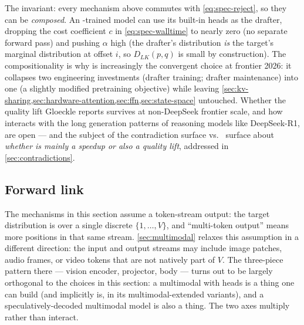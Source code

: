 The  invariant: every mechanism above commutes with
\cref{eq:spec-reject}, so they can be \emph{composed}. An -trained
model can use its built-in heads as the drafter, dropping the cost
coefficient $c$ in \cref{eq:spec-walltime} to nearly zero (no separate
forward pass) and pushing $\alpha$ high (the drafter's distribution
\emph{is} the target's marginal distribution at offset $i$, so
$D_{LK}(p, q)$ is small by construction). The compositionality is why
 is increasingly the convergent choice at frontier 2026: it
collapses two engineering investments (drafter training; drafter
maintenance) into one (a slightly modified pretraining objective)
while leaving \cref{sec:kv-sharing,sec:hardware-attention,sec:ffn,sec:state-space}
untouched. Whether the quality lift Gloeckle reports survives at
non-DeepSeek frontier scale, and how  interacts with the long
 generation patterns of reasoning models like
DeepSeek-R1, are open --- and the subject of the contradiction
\citet{gloeckle2024-mtp} surface vs.\ \citet{deepseek-v3} surface
about \emph{whether  is mainly a speedup or also a quality lift},
addressed in \cref{sec:contradictions}.

\subsection{Forward link}
\label{sec:mt-forward}

The mechanisms in this section assume a token-stream output: the
target distribution is over a single discrete  $\{1, \ldots,
V\}$, and ``multi-token output'' means more positions in that same
stream. \cref{sec:multimodal} relaxes this assumption in a different
direction: the input and output streams may include image patches,
audio frames, or video tokens that are not natively part of $V$. The
three-piece pattern there --- vision encoder, projector,  body ---
turns out to be largely orthogonal to the choices in this section: a
multimodal  with  heads is a thing one can build (and 
implicitly is, in its multimodal-extended variants), and a
speculatively-decoded multimodal model is also a thing. The two axes
multiply rather than interact.

